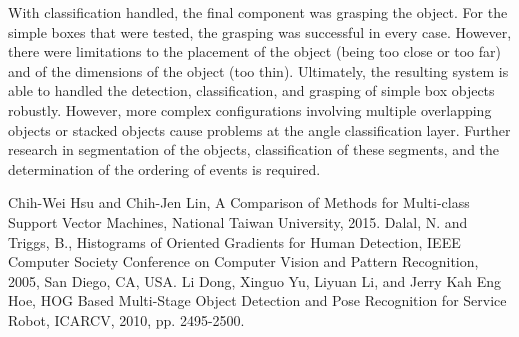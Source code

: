 \documentclass[letterpaper, 10 pt, conference]{conf/ieeeconf}  %
\begin{document}
With classification handled, the final component was grasping the object. For
the simple boxes that were tested, the grasping was successful in every case.
However, there were limitations to the placement of the object (being too close
or too far) and of the dimensions of the object (too thin). Ultimately, the
resulting system is able to handled the detection, classification, and grasping
of simple box objects robustly. However, more complex configurations involving
multiple overlapping objects or stacked objects cause problems at the angle
classification layer. Further research in segmentation of the objects,
classification of these segments, and the determination of the ordering of
events is required.





\addtolength{\textheight}{-12cm}   %




\begin{thebibliography}{99}

 Chih-Wei Hsu and Chih-Jen Lin, A Comparison of Methods for
  Multi-class Support Vector Machines, National Taiwan University, 2015.
 Dalal, N. and Triggs, B., Histograms of Oriented Gradients
  for Human Detection, IEEE Computer Society Conference on Computer Vision and
  Pattern Recognition, 2005, San Diego, CA, USA.
 Li Dong, Xinguo Yu, Liyuan Li, and Jerry Kah Eng Hoe, HOG Based
  Multi-Stage Object Detection and Pose Recognition for Service Robot, ICARCV,
  2010, pp. 2495-2500.
\end{thebibliography}
\end{document}
